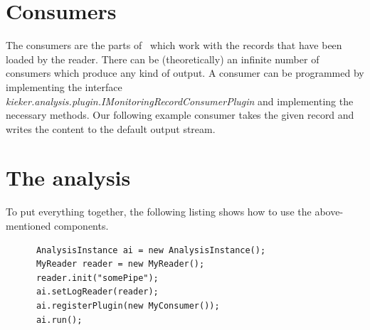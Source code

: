       \section{Consumers}
	The consumers are the parts of \Kieker\ which work with the records that have been loaded by the reader. There can be (theoretically) an infinite number of consumers which produce any kind of output. A consumer can be programmed by implementing the interface \textit{kieker.analysis.plugin.IMonitoringRecordConsumerPlugin} and implementing the necessary methods. Our following example consumer takes the given record and writes the content to the default output stream.
	\setJavaCodeListing
	\lstset{caption=MyConsumer.java}
	

      \section{The analysis}
	To put everything together, the following listing shows how to use the above-mentioned components.
	\setJavaCodeListing
	\begin{lstlisting}
	  AnalysisInstance ai = new AnalysisInstance();
	  MyReader reader = new MyReader();
	  reader.init("somePipe");
	  ai.setLogReader(reader);
	  ai.registerPlugin(new MyConsumer());
	  ai.run();
	\end{lstlisting}